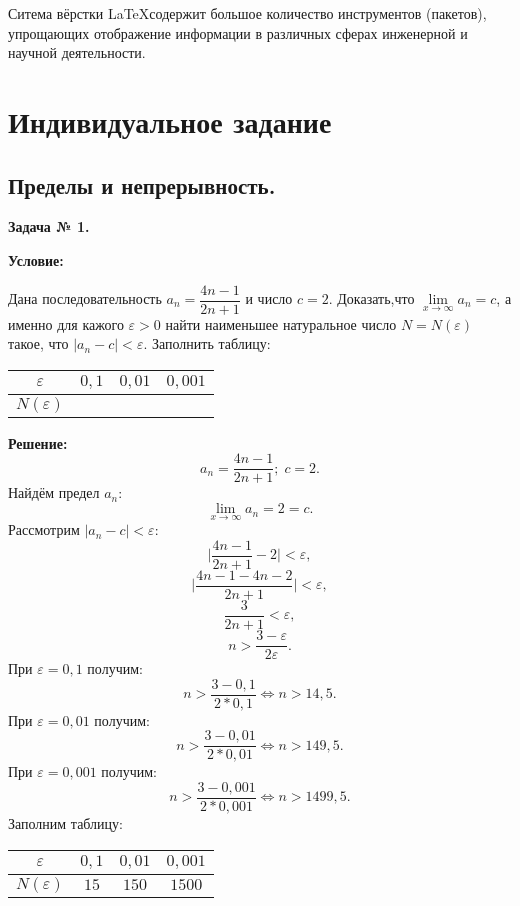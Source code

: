 \documentclass[12pt]{article}
\newcommand{\eps}{\varepsilon}
\begin{document}
Ситема вёрстки \LaTeX содержит большое количество инструментов (пакетов), упрощающих отображение информации в различных 
сферах инженерной и научной деятельности. 


\newpage
\section{Индивидуальное задание}



\subsection{Пределы и непрерывность.}

\begin{center}
\textbf{Задача № 1.}   
\end{center}

\textbf{Условие:}

Дана последовательность  $a_{n}=\dfrac{4n-1}{2n+1}$ и число $c=2$. Доказать,что $\lim\limits_{x\rightarrow\infty} a_{n}=c$, а именно для кажого $\eps > 0$ найти наименьшее натуральное число $N = N(\eps)$ такое, что $|a_{n}-c|<\eps$. Заполнить таблицу:
\begin{table}[h]
    \centering
    \begin{tabular}{|c|c|c|c|}
        \hline
         $\eps$ & $0,1$ & $0,01$ & $0,001$ \\
         \hline
         $N(\eps)$ &  &  & \\
         \hline
    \end{tabular}
\end{table}

\textbf{Решение:}
$$a_{n}=\dfrac{4n-1}{2n+1}; \; c = 2.$$ 
Найдём предел $a_{n}$:
$$\lim\limits_{x\rightarrow\infty} a_{n}= 2 = c.$$
Рассмотрим  $|a_{n}-c|<\eps$:
$$\biggl |\dfrac{4n-1}{2n+1} - 2  \biggr |<\eps,$$
$$\biggl |\dfrac{4n-1-4n-2}{2n+1} \biggr | <\eps,$$
$$\dfrac{3}{2n+1} < \eps,$$
$$n > \dfrac{3-\eps}{2\eps}.$$
При $\eps = 0,1$ получим:
$$ n > \dfrac{3-0,1}{2*0,1} \Leftrightarrow n > 14,5.$$
При $\eps = 0,01$ получим:
$$ n > \dfrac{3-0,01}{2*0,01} \Leftrightarrow n > 149,5.$$
При $\eps = 0,001$ получим:
$$ n > \dfrac{3-0,001}{2*0,001} \Leftrightarrow n > 1499,5.$$
Заполним таблицу:
\begin{table}[h]
    \centering
    \begin{tabular}{|c|c|c|c|}
        \hline
         $\eps$ & $0,1$ & $0,01$ & $0,001$ \\
         \hline
         $N(\eps)$ & $15$ & $150$  & $1500$ \\
         \hline
    \end{tabular}
\end{table}
\end{document}
